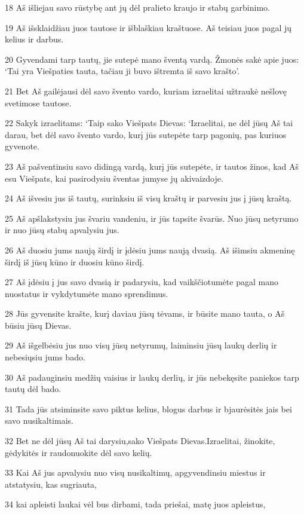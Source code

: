 \par 18 Aš išliejau savo rūstybę ant jų dėl pralieto kraujo ir stabų garbinimo. 
\par 19 Aš išsklaidžiau juos tautose ir išblaškiau kraštuose. Aš teisiau juos pagal jų kelius ir darbus. 
\par 20 Gyvendami tarp tautų, jie sutepė mano šventą vardą. Žmonės sakė apie juos: ‘Tai yra Viešpaties tauta, tačiau ji buvo ištremta iš savo krašto’. 
\par 21 Bet Aš gailėjausi dėl savo švento vardo, kuriam izraelitai užtraukė nešlovę svetimose tautose. 
\par 22 Sakyk izraelitams: ‘Taip sako Viešpats Dievas: ‘Izraelitai, ne dėl jūsų Aš tai darau, bet dėl savo švento vardo, kurį jūs sutepėte tarp pagonių, pas kuriuos gyvenote. 
\par 23 Aš pašventinsiu savo didingą vardą, kurį jūs sutepėte, ir tautos žinos, kad Aš esu Viešpats, kai pasirodysiu šventas jumyse jų akivaizdoje. 
\par 24 Aš išvesiu jus iš tautų, surinksiu iš visų kraštų ir parvesiu jus į jūsų kraštą. 
\par 25 Aš apšlakstysiu jus švariu vandeniu, ir jūs tapsite švarūs. Nuo jūsų netyrumo ir nuo jūsų stabų apvalysiu jus. 
\par 26 Aš duosiu jums naują širdį ir įdėsiu jums naują dvasią. Aš išimsiu akmeninę širdį iš jūsų kūno ir duosiu kūno širdį. 
\par 27 Aš įdėsiu į jus savo dvasią ir padarysiu, kad vaikščiotumėte pagal mano nuostatus ir vykdytumėte mano sprendimus. 
\par 28 Jūs gyvensite krašte, kurį daviau jūsų tėvams, ir būsite mano tauta, o Aš būsiu jūsų Dievas. 
\par 29 Aš išgelbėsiu jus nuo visų jūsų netyrumų, laiminsiu jūsų laukų derlių ir nebesiųsiu jums bado. 
\par 30 Aš padauginsiu medžių vaisius ir laukų derlių, ir jūs nebekęsite paniekos tarp tautų dėl bado. 
\par 31 Tada jūs atsiminsite savo piktus kelius, blogus darbus ir bjaurėsitės jais bei savo nusikaltimais. 
\par 32 Bet ne dėl jūsų Aš tai darysiu,­sako Viešpats Dievas.­Izraelitai, žinokite, gėdykitės ir raudonuokite dėl savo kelių. 
\par 33 Kai Aš jus apvalysiu nuo visų nusikaltimų, apgyvendinsiu miestus ir atstatysiu, kas sugriauta, 
\par 34 kai apleisti laukai vėl bus dirbami, tada priešai, matę juos apleistus, 
